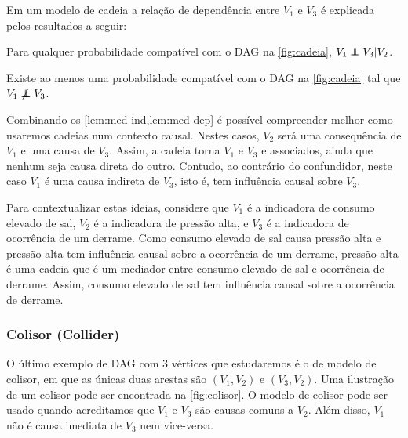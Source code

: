 Em um modelo de cadeia 
a relação de dependência entre 
$V_1$ e $V_3$ é explicada pelos
resultados a seguir:

\begin{lemma}
 \label{lem:med-ind}
 Para qualquer probabilidade compatível com 
 o DAG na \cref{fig:cadeia},
 $V_1 \perp\!\!\!\!\perp V_3 | V_2$.
\end{lemma}

\begin{lemma}
 \label{lem:med-dep}
 Existe ao menos uma probabilidade compatível com
 o DAG na \cref{fig:cadeia} tal que
 $V_1 \not\perp\!\!\!\!\perp V_3$.
\end{lemma}

Combinando os \cref{lem:med-ind,lem:med-dep} é 
possível compreender melhor como 
usaremos cadeias num contexto causal.
Nestes casos, $V_2$ será uma consequência de $V_1$ e
uma causa de $V_3$. Assim, a cadeia torna
$V_1$ e $V_3$ e associados, 
ainda que nenhum seja causa direta do outro.
Contudo, ao contrário do confundidor,
neste caso $V_1$ é uma causa indireta de $V_3$,
isto é, tem influência causal sobre $V_3$.

Para contextualizar estas ideias,
considere que $V_1$ é a indicadora de consumo elevado de sal,
$V_2$ é a indicadora de pressão alta, e
$V_3$ é a indicadora de ocorrência de um derrame.
Como consumo elevado de sal causa pressão alta e
pressão alta tem influência causal sobre a ocorrência de um derrame,
pressão alta é uma cadeia que é
um mediador entre consumo elevado de sal e
ocorrência de derrame. Assim,
consumo elevado de sal tem influência causal sobre
a ocorrência de derrame.

\subsubsection{Colisor (Collider)}

O último exemplo de DAG com $3$ vértices que 
estudaremos é o de modelo de colisor, em que
as únicas duas arestas são 
$(V_1, V_2)$ e $(V_3, V_2)$.
Uma ilustração de um colisor
pode ser encontrada 
na \cref{fig:colisor}.
O modelo de colisor pode ser usado quando
acreditamos que $V_1$ e $V_3$ são 
causas comuns a $V_2$. Além disso,
$V_1$ não é causa imediata de $V_3$ 
nem vice-versa.

